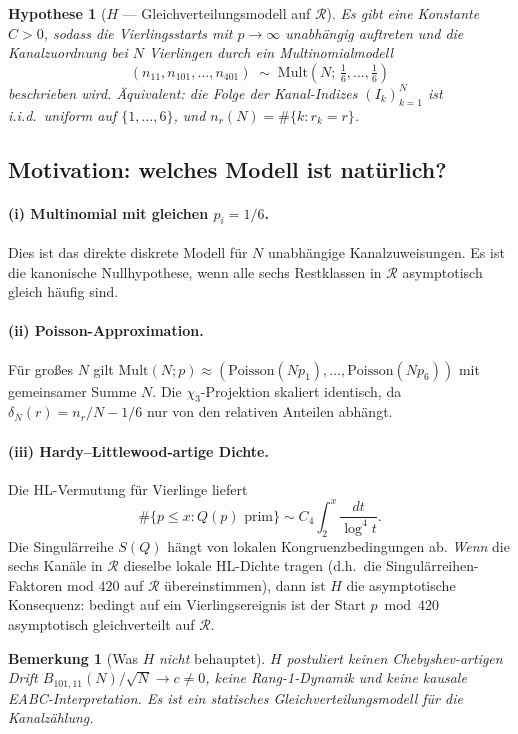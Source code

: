 \documentclass[11pt,a4paper]{article}
\newtheorem{hypothesis}{Hypothese}
\newtheorem{remark}{Bemerkung}
\newcommand{\R}{\mathcal{R}}
\begin{document}
\begin{hypothesis}[$H$ --- Gleichverteilungsmodell auf $\R$]
\label{hyp:H}
Es gibt eine Konstante $C>0$, sodass die Vierlingsstarts mit
$p\to\infty$ unabhängig auftreten und die Kanalzuordnung bei $N$
Vierlingen durch ein \emph{Multinomialmodell}
\[
  (n_{11},n_{101},\ldots,n_{401}) \;\sim\;
  \mathrm{Mult}\!\left(N;\,\tfrac{1}{6},\ldots,\tfrac{1}{6}\right)
\]
beschrieben wird.
Äquivalent: die Folge der Kanal-Indizes
$(I_k)_{k=1}^{N}$ ist i.i.d.\ uniform auf $\{1,\ldots,6\}$,
und $n_r(N)=\#\{k: r_k=r\}$.
\end{hypothesis}

\subsection{Motivation: welches Modell ist natürlich?}

\paragraph{(i) Multinomial mit gleichen $p_i=1/6$.}
Dies ist das direkte diskrete Modell für $N$ unabhängige Kanalzuweisungen.
Es ist die kanonische Nullhypothese, wenn alle sechs Restklassen in $\R$
asymptotisch gleich häufig sind.

\paragraph{(ii) Poisson-Approximation.}
Für großes $N$ gilt
$\mathrm{Mult}(N;p)\approx (\mathrm{Poisson}(Np_1),\ldots,\mathrm{Poisson}(Np_6))$
mit gemeinsamer Summe $N$.
Die $\chi_3$-Projektion skaliert identisch, da
$\delta_N(r)=n_r/N-1/6$ nur von den relativen Anteilen abhängt.

\paragraph{(iii) Hardy--Littlewood-artige Dichte.}
Die HL-Vermutung für Vierlinge liefert
\[
  \#\{p\le x : Q(p)\text{ prim}\} \sim C_4 \int_2^x \frac{dt}{\log^4 t}.
\]
Die Singulärreihe $S(Q)$ hängt von lokalen Kongruenzbedingungen ab.
\emph{Wenn} die sechs Kanäle in $\R$ dieselbe lokale HL-Dichte tragen
(d.h.\ die Singulärreihen-Faktoren mod $420$ auf $\R$ übereinstimmen),
dann ist $H$ die asymptotische Konsequenz: bedingt auf ein Vierlingsereignis
ist der Start $p\bmod 420$ asymptotisch gleichverteilt auf $\R$.

\begin{remark}[Was $H$ \emph{nicht} behauptet]
$H$ postuliert keinen Chebyshev-artigen Drift
$B_{101,11}(N)/\sqrt{N}\to c\neq 0$,
keine Rang-1-Dynamik und keine kausale EABC-Interpretation.
Es ist ein \emph{statisches} Gleichverteilungsmodell für die Kanalzählung.
\end{remark}
\end{document}
